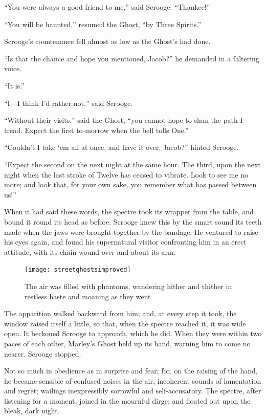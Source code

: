 \documentclass[paper=a5,BCOR=15mm,twoside,DIV=15,headinclude=off,12pt,chapterprefix=off,openany,headings=huge]{scrbook} %
\begin{document}
\enquote{You were always a good friend to me,} said Scrooge. \enquote{Thankee!}

\enquote{You will be haunted,} resumed the Ghost, \enquote{by Three Spirits.}

Scrooge's countenance fell almost as low as the Ghost's had done.

\enquote{Is that the chance and hope you mentioned, Jacob?} he demanded in a faltering voice.

\enquote{It is.}

\enquote{I—I think I'd rather not,} said Scrooge.

\enquote{Without their visits,} said the Ghost, \enquote{you cannot hope to shun the path I tread. Expect the first to-morrow when the bell tolls One.}

\enquote{Couldn't I take `em all at once, and have it over, Jacob?} hinted Scrooge.

\enquote{Expect the second on the next night at the same hour. The third, upon the next night when the last stroke of Twelve has ceased to vibrate. Look to see me no more; and look that, for your own sake, you remember what has passed between us!}

When it had said these words, the spectre took its wrapper from the table, and bound it round its head as before. Scrooge knew this by the smart sound its teeth made when the jaws were brought together by the bandage. He ventured to raise his eyes again, and found his supernatural visitor confronting him in an erect attitude, with its chain wound over and about its arm.

\begin{figure}[p]
\begin{minipage}[c]{\linewidth}
\texttt{[image: streetghostsimproved]}
\caption*{The air was filled with phantoms, wandering hither and thither in restless haste and moaning as they went}
\end{minipage}
\end{figure}

The apparition walked backward from him; and, at every step it took, the window raised itself a little, so that, when the spectre reached it, it was wide open. It beckoned Scrooge to approach, which he did. When they were within two paces of each other, Marley's Ghost held up its hand, warning him to come no nearer. Scrooge stopped.

Not so much in obedience as in surprise and fear; for, on the raising of the hand, he became sensible of confused noises in the air; incoherent sounds of lamentation and regret; wailings inexpressibly sorrowful and self-accusatory. The spectre, after listening for a moment, joined in the mournful dirge; and floated out upon the bleak, dark night.
\end{document}
